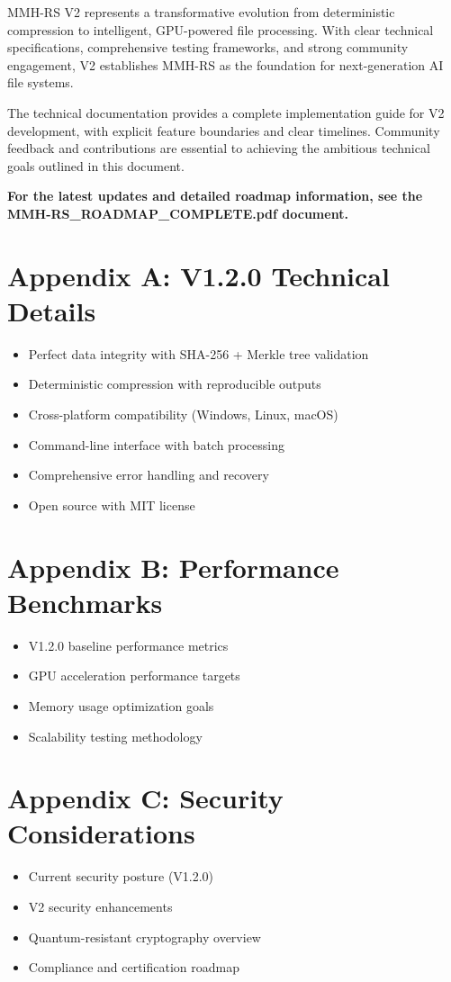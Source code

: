 \documentclass[12pt,a4paper]{article}
\begin{document}
MMH-RS V2 represents a transformative evolution from deterministic compression to intelligent, GPU-powered file processing. With clear technical specifications, comprehensive testing frameworks, and strong community engagement, V2 establishes MMH-RS as the foundation for next-generation AI file systems.

The technical documentation provides a complete implementation guide for V2 development, with explicit feature boundaries and clear timelines. Community feedback and contributions are essential to achieving the ambitious technical goals outlined in this document.

\textbf{For the latest updates and detailed roadmap information, see the MMH-RS\_ROADMAP\_COMPLETE.pdf document.}

\appendix

\section{Appendix A: V1.2.0 Technical Details}
\begin{itemize}
    \item Perfect data integrity with SHA-256 + Merkle tree validation
    \item Deterministic compression with reproducible outputs
    \item Cross-platform compatibility (Windows, Linux, macOS)
    \item Command-line interface with batch processing
    \item Comprehensive error handling and recovery
    \item Open source with MIT license
\end{itemize}

\section{Appendix B: Performance Benchmarks}
\begin{itemize}
    \item V1.2.0 baseline performance metrics
    \item GPU acceleration performance targets
    \item Memory usage optimization goals
    \item Scalability testing methodology
\end{itemize}

\section{Appendix C: Security Considerations}
\begin{itemize}
    \item Current security posture (V1.2.0)
    \item V2 security enhancements
    \item Quantum-resistant cryptography overview
    \item Compliance and certification roadmap
\end{itemize}
\end{document}
